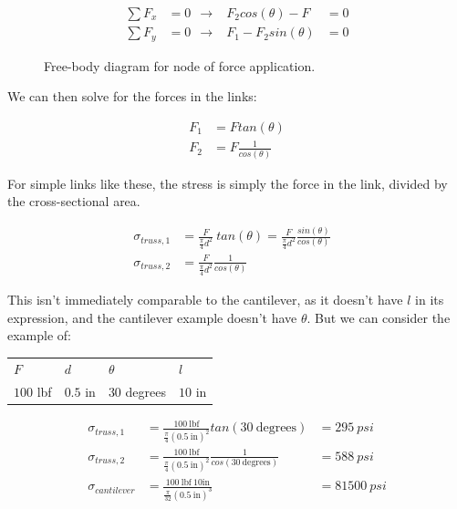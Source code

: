 \begin{figure}[H]
\begin{subfigure}[b]{.4\linewidth}
\end{subfigure}\begin{subfigure}[b]{.5\linewidth}
\begin{align}
	\sum F_x &= 0 \ \ \rightarrow & F_2 cos(\theta) - F &= 0 \\
	\sum F_y &= 0 \ \ \rightarrow & F_1 - F_2 sin(\theta) &= 0
\end{align}
\end{subfigure}
\caption{Free-body diagram for node of force application.}
\end{figure}

We can then solve for the forces in the links:

\begin{align}
	F_1 &= F tan(\theta) \\
	F_2 &= F \frac{1}{cos(\theta)}
\end{align}

For simple links like these, the stress is simply the force in the link, divided by the cross-sectional area.

\begin{align}
	\sigma_{truss, 1} &= \frac{F}{\frac{\pi}{4} d^2} \ tan (\theta) = \frac{F}{\frac{\pi}{4} d^2} \frac{sin(\theta)}{cos(\theta)} \\
	\sigma_{truss, 2} &= \frac{F}{\frac{\pi}{4} d^2} \frac{1}{cos(\theta)} & 
\end{align}

This isn't immediately comparable to the cantilever, as it doesn't have $l$ in its expression, and the cantilever example doesn't have $\theta$. But we can consider the example of:

\begin{table}[H]
\begin{tabular}{llll}
$F$       & $d$      & $\theta$      & $l$     \\
$100$ lbf & $0.5$ in & $30$ degrees & $10$ in
\end{tabular}
\end{table}

\begin{align}
	\sigma_{truss, 1} &= \frac{100 \ \mbox{lbf}}{\frac{\pi}{4} (0.5 \ \mbox{in})^2 } tan(30 \ \mbox{degrees}) &= 295 \ psi\\
	\sigma_{truss, 2} &= \frac{100 \ \mbox{lbf}}{\frac{\pi}{4} (0.5 \ \mbox{in})^2 } \frac{1}{cos(30 \ \mbox{degrees})} &= 588 \ psi \\
	\sigma_{cantilever} &= \frac{100 \ \mbox{lbf} \ 10 \mbox{in}}{\frac{\pi}{32} (0.5 \ \mbox{in})^3} &= 81500 \ psi
\end{align}

